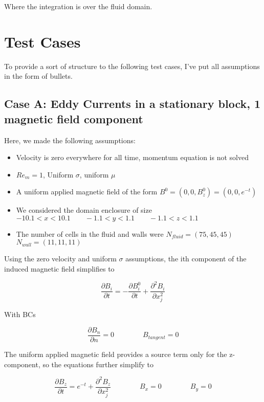\documentclass[11pt]{article}
\begin{document}
Where the integration is over the fluid domain.

\section{Test Cases}
To provide a sort of structure to the following test cases, I've put all assumptions in the form of bullets.

\subsection{Case A: Eddy Currents in a stationary block, 1 magnetic field component}
Here, we made the following assumptions:

\begin{itemize}
\item Velocity is zero everywhere for all time, momentum equation is not solved
\item $Re_m = 1$, Uniform $\sigma$, uniform $\mu$
\item A uniform applied magnetic field of the form $B^0 = (0,0,B_z^0) = (0,0,e^{-t})$
\item We considered the domain enclosure of size $-10.1 < x < 10.1 \qquad -1.1 < y < 1.1 \qquad -1.1 < z < 1.1$
\item The number of cells in the fluid and walls were $N_{fluid} = (75,45,45)$ \qquad $N_{wall} = (11,11,11)$
\end{itemize}

Using the zero velocity and uniform $\sigma$ assumptions, the ith component of the induced magnetic field simplifies to

\begin{equation}
	\frac{\partial B_i}{\partial t}
	=
	-
	\frac{\partial B_i^0}{\partial t}
	+
	\frac{\partial^2 B_i}{\partial x_j^2}
\end{equation}

With BCs

\begin{equation}
	\frac{\partial B_{n}}{\partial n} = 0
	\qquad \qquad
	B_{tangent} = 0
\end{equation}

The uniform applied magnetic field provides a source term only for the z-component, so the equations further simplify to

\begin{equation}
	\frac{\partial B_z}{\partial t}
	=
	e^{-t}
	+
	\frac{\partial^2 B_z}{\partial x_j^2}
	\qquad \qquad
	B_x = 0
	\qquad \qquad
	B_y = 0
\end{equation}
\end{document}
